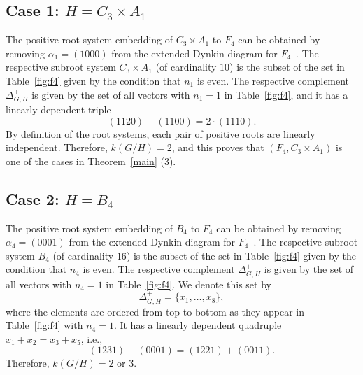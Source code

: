 \documentclass{amsart}
\theoremstyle{definition}
\theoremstyle{remark}
\numberwithin{equation}{section}
\begin{document}
\subsection{Case 1: $H=C_{3}\times A_{1}$}
\label{sect:8.1}

The positive root system embedding of $C_{3}\times A_{1}$ to $F_{4}$ can be obtained by removing $\alpha_{1}=(1000)$ from the extended Dynkin diagram for $F_{4}$~\cite[p.58]{Y25}. 
The respective subroot system $C_{3}\times A_{1}$ (of cardinality $10$) is the subset of the set in Table~\ref{fig:f4} given by the condition that $n_{1}$ is even.
The respective complement $\Delta_{G,H}^{+}$ is given by the set of all vectors with $n_{1}=1$ in Table~\ref{fig:f4}, 
and it has a linearly dependent triple
\[
(1120)+(1100)=2\cdot (1110).
\]
By definition of the root systems, each pair of positive roots are linearly independent.
Therefore, $k(G/H)=2$, and this proves that $(F_{4},C_{3}\times A_{1})$ is one of the cases in Theorem~\ref{main} (3).

\subsection{Case 2: $H=B_{4}$}
\label{sect:8.2}
The positive root system embedding of $B_{4}$ to $F_{4}$ 
can be obtained by removing 
$\alpha_{4}=(0001)$ from the extended Dynkin diagram for $F_{4}$~\cite[p.58]{Y25}.
The respective subroot system $B_{4}$ (of cardinality $16$) is the subset of the set in Table~\ref{fig:f4} given by the condition that $n_{4}$ is even.
The respective complement $\Delta_{G,H}^{+}$ is given by the set of all vectors with $n_{4}=1$ in Table~\ref{fig:f4}.
We denote this set by
\[
\Delta_{G,H}^{+} = \{x_1, \ldots, x_8\},
\]
where the elements are ordered from top to bottom as they appear in Table~\ref{fig:f4} with $n_{4}=1$.
It has a linearly dependent quadruple $x_{1}+x_{2}=x_{3}+x_{5}$, i.e., 
\[
(1231)+(0001)=(1221)+(0011).
\]
Therefore, $k(G/H)=2$ or $3$.
\end{document}
